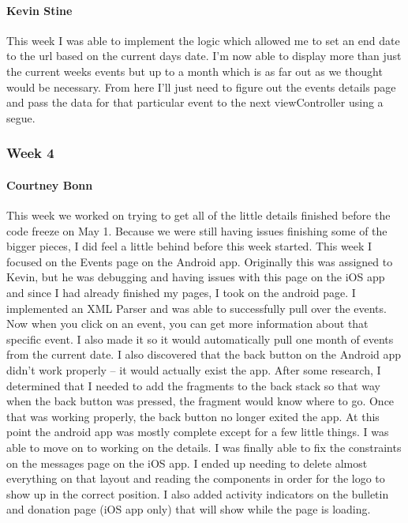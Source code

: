 			\paragraph{Kevin Stine}
			This week I was able to implement the logic which allowed me to set an end date to the url based on the current days date. I'm now able to display more than just the current weeks events but up to a month which is as far out as we thought would be necessary. From here I'll just need to figure out the events details page and pass the data for that particular event to the next viewController using a segue.
			
		\subsubsection{Week 4}
		
			\paragraph{Courtney Bonn}
			This week we worked on trying to get all of the little details finished before the code freeze on May 1. Because we were still having issues finishing some of the bigger pieces, I did feel a little behind before this week started. This week I focused on the Events page on the Android app. Originally this was assigned to Kevin, but he was debugging and having issues with this page on the iOS app and since I had already finished my pages, I took on the android page. I implemented an XML Parser and was able to successfully pull over the events. Now when you click on an event, you can get more information about that specific event. I also made it so it would automatically pull one month of events from the current date. I also discovered that the back button on the Android app didn't work properly -- it would actually exist the app. After some research, I determined that I needed to add the fragments to the back stack so that way when the back button was pressed, the fragment would know where to go. Once that was working properly, the back button no longer exited the app. At this point the android app was mostly complete except for a few little things. I was able to move on to working on the details. I was finally able to fix the constraints on the messages page on the iOS app. I ended up needing to delete almost everything on that layout and reading the components in order for the logo to show up in the correct position. I also added activity indicators on the bulletin and donation page (iOS app only) that will show while the page is loading.

